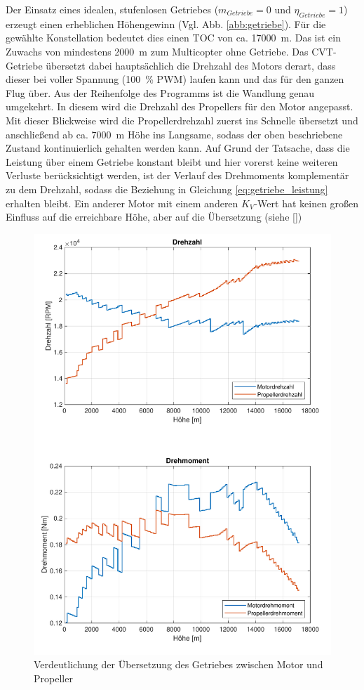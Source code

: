 Der Einsatz eines idealen, stufenlosen Getriebes (\ensuremath{m_{Getriebe} = 0} und \ensuremath{\eta_{Getriebe} = 1}) erzeugt einen erheblichen Höhengewinn (Vgl. Abb. \ref{abb:getriebe}). Für die gewählte Konstellation bedeutet dies einen TOC von ca. \SI{17000}{m}. Das ist ein Zuwachs von mindestens \SI{2000}{m} zum Multicopter ohne Getriebe. Das CVT-Getriebe übersetzt dabei hauptsächlich die Drehzahl des Motors derart, dass dieser bei voller Spannung (\SI{100}{\%} PWM) laufen kann und das für den ganzen Flug über. Aus der Reihenfolge des Programms ist die Wandlung genau umgekehrt. In diesem wird die Drehzahl des Propellers für den Motor angepasst. Mit dieser Blickweise wird die Propellerdrehzahl zuerst ins Schnelle übersetzt und anschließend ab ca. \SI{7000}{m} Höhe ins Langsame, sodass der oben beschriebene Zustand kontinuierlich gehalten werden kann. Auf Grund der Tatsache, dass die Leistung über einem Getriebe konstant bleibt und hier vorerst keine weiteren Verluste berücksichtigt werden, ist der Verlauf des Drehmoments komplementär zu dem Drehzahl, sodass die Beziehung in Gleichung \ref{eq:getriebe_leistung} erhalten bleibt. Ein anderer Motor mit einem anderen \ensuremath{K_V}-Wert hat keinen großen Einfluss auf die erreichbare Höhe, aber auf die Übersetzung (siehe \ref{})

\begin{figure}[H]
\centering
	\includegraphics[scale=0.5]{Diagramme/Drehzahl_und_Drehmoment.pdf}
	\caption{Verdeutlichung der Übersetzung des Getriebes zwischen Motor und Propeller}
	\label{abb:getriebe_dud}
\end{figure}

